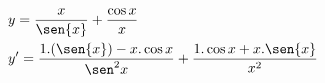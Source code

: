 \begin{ex}
\begin{align}
&y=\frac{x}{\sen{x}}+\frac{\cos{x}}{x}\nonumber\\
&y'=\frac{1.(\sen{x})-x.\cos{x}}{\sen^2{x}}+\frac{1.\cos{x}+x.\sen{x}}{x^2}\nonumber
\end{align}
\end{ex}
